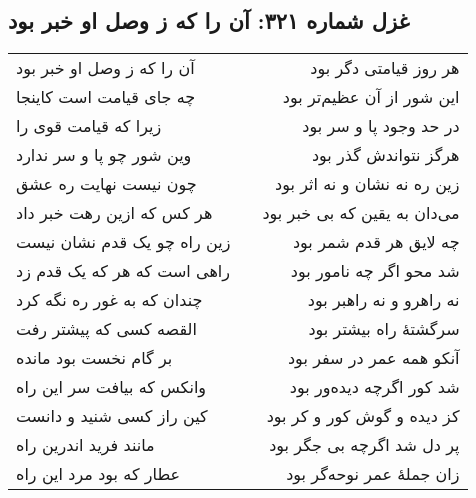 \begin{center}
\section*{غزل شماره ۳۲۱: آن را که ز وصل او خبر بود}
\label{sec:321}
\begin{longtable}{l p{0.5cm} r}
آن را که ز وصل او خبر بود
&&
هر روز قیامتی دگر بود
\\
چه جای قیامت است کاینجا
&&
این شور از آن عظیم‌تر بود
\\
زیرا که قیامت قوی را
&&
در حد وجود پا و سر بود
\\
وین شور چو پا و سر ندارد
&&
هرگز نتواندش گذر بود
\\
چون نیست نهایت ره عشق
&&
زین ره نه نشان و نه اثر بود
\\
هر کس که ازین رهت خبر داد
&&
می‌دان به یقین که بی خبر بود
\\
زین راه چو یک قدم نشان نیست
&&
چه لایق هر قدم شمر بود
\\
راهی است که هر که یک قدم زد
&&
شد محو اگر چه نامور بود
\\
چندان که به غور ره نگه کرد
&&
نه راهرو و نه راهبر بود
\\
القصه کسی که پیشتر رفت
&&
سرگشتهٔ راه بیشتر بود
\\
بر گام نخست بود مانده
&&
آنکو همه عمر در سفر بود
\\
وانکس که بیافت سر این راه
&&
شد کور اگرچه دیده‌ور بود
\\
کین راز کسی شنید و دانست
&&
کز دیده و گوش کور و کر بود
\\
مانند فرید اندرین راه
&&
پر دل شد اگرچه بی جگر بود
\\
عطار که بود مرد این راه
&&
زان جملهٔ عمر نوحه‌گر بود
\\
\end{longtable}
\end{center}
